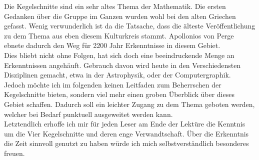 Die Kegelschnitte sind ein sehr altes Thema der Mathematik. Die ersten Gedanken über die Gruppe im Ganzen wurden wohl bei den alten Griechen gefasst. Wenig verwunderlich ist da die Tatsache, dass die älteste Veröffentlichung zu dem Thema aus eben diesem Kulturkreis stammt. Apollonios von Perge~\cite{Perge:1967} ebnete dadurch den Weg für 2200 Jahr Erkenntnisse in diesem Gebiet.\\
Dies bliebt nicht ohne Folgen, hat sich doch eine beeindruckende Menge an Erkenntnissen angehäuft. Gebrauch davon wird heute in den Verschiedensten Disziplinen gemacht, etwa in der Astrophysik, oder der Computergraphik.\\
Jedoch möchte ich im folgenden keinen Leitfaden zum Beherrschen der Kegelschnitte bieten, sondern viel mehr einen groben Überblick über dieses Gebiet schaffen. Dadurch soll ein leichter Zugang zu dem Thema geboten werden, welcher bei Bedarf punktuell ausgeweitet werden kann.\\
Letztendlich erhoffe ich mir für jeden Leser am Ende der Lektüre die Kenntnis um die Vier Kegelschnitte und deren enge Verwandtschaft. Über die Erkenntnis die Zeit sinnvoll genutzt zu haben würde ich mich selbstverständlich besonderes freuen.\\
